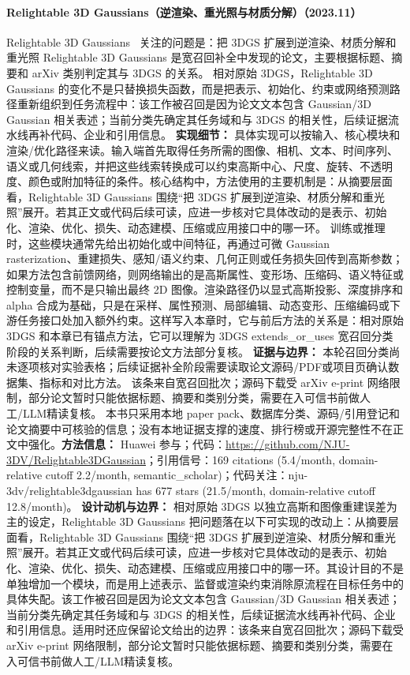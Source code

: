 \paragraph{Relightable 3D Gaussians（逆渲染、重光照与材质分解）（2023.11）}
Relightable 3D Gaussians~\cite{2311_16043} 关注的问题是：把 3DGS 扩展到逆渲染、材质分解和重光照 Relightable 3D Gaussians 是宽召回补全中发现的论文，主要根据标题、摘要和 arXiv 类别判定其与 3DGS 的关系。
相对原始 3DGS，Relightable 3D Gaussians 的变化不是只替换损失函数，而是把表示、初始化、约束或网络预测路径重新组织到任务流程中：该工作被召回是因为论文文本包含 Gaussian/3D Gaussian 相关表述；当前分类先确定其任务域和与 3DGS 的相关性，后续证据流水线再补代码、企业和引用信息。
\textbf{实现细节：} 具体实现可以按输入、核心模块和渲染/优化路径来读。输入端首先取得任务所需的图像、相机、文本、时间序列、语义或几何线索，并把这些线索转换成可以约束高斯中心、尺度、旋转、不透明度、颜色或附加特征的条件。核心结构中，方法使用的主要机制是：从摘要层面看，Relightable 3D Gaussians 围绕“把 3DGS 扩展到逆渲染、材质分解和重光照”展开。若其正文或代码后续可读，应进一步核对它具体改动的是表示、初始化、渲染、优化、损失、动态建模、压缩或应用接口中的哪一环。 训练或推理时，这些模块通常先给出初始化或中间特征，再通过可微 Gaussian rasterization、重建损失、感知/语义约束、几何正则或任务损失回传到高斯参数；如果方法包含前馈网络，则网络输出的是高斯属性、变形场、压缩码、语义特征或控制变量，而不是只输出最终 2D 图像。渲染路径仍以显式高斯投影、深度排序和 alpha 合成为基础，只是在采样、属性预测、局部编辑、动态变形、压缩编码或下游任务接口处加入额外约束。这样写入本章时，它与前后方法的关系是：相对原始 3DGS 和本章已有锚点方法，它可以理解为 3DGS extends\_or\_uses 宽召回分类阶段的关系判断，后续需要按论文方法部分复核。
\textbf{证据与边界：} 本轮召回分类尚未逐项核对实验表格；后续证据补全阶段需要读取论文源码/PDF或项目页确认数据集、指标和对比方法。 该条来自宽召回批次；源码下载受 arXiv e-print 网络限制，部分论文暂时只能依据标题、摘要和类别分类，需要在入可信书前做人工/LLM精读复核。 本书只采用本地 paper pack、数据库分类、源码/引用登记和论文摘要中可核验的信息；没有本地证据支撑的速度、排行榜或开源完整性不在正文中强化。\textbf{方法信息：} Huawei 参与；代码：\url{https://github.com/NJU-3DV/Relightable3DGaussian}；引用信号：169 citations (5.4/month, domain-relative cutoff 2.2/month, semantic\_scholar)；代码关注：nju-3dv/relightable3dgaussian has 677 stars (21.5/month, domain-relative cutoff 12.8/month)。
\textbf{设计动机与边界：} 相对原始 3DGS 以独立高斯和图像重建误差为主的设定，Relightable 3D Gaussians 把问题落在以下可实现的改动上：从摘要层面看，Relightable 3D Gaussians 围绕“把 3DGS 扩展到逆渲染、材质分解和重光照”展开。若其正文或代码后续可读，应进一步核对它具体改动的是表示、初始化、渲染、优化、损失、动态建模、压缩或应用接口中的哪一环。其设计目的不是单独增加一个模块，而是用上述表示、监督或渲染约束消除原流程在目标任务中的具体失配。该工作被召回是因为论文文本包含 Gaussian/3D Gaussian 相关表述；当前分类先确定其任务域和与 3DGS 的相关性，后续证据流水线再补代码、企业和引用信息。适用时还应保留论文给出的边界：该条来自宽召回批次；源码下载受 arXiv e-print 网络限制，部分论文暂时只能依据标题、摘要和类别分类，需要在入可信书前做人工/LLM精读复核。
